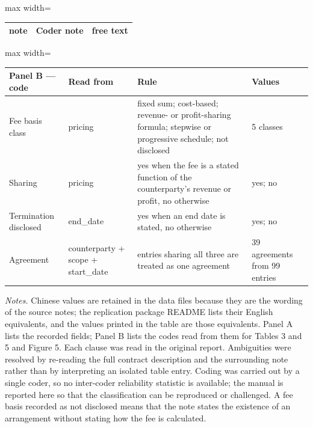 \documentclass[review,3p,times]{elsarticle}
\begin{document}
\begin{table}[!htbp]
\begin{minipage}{\textwidth}
\begin{adjustbox}{max width=\textwidth}
\begin{tabular}{@{}lll@{}}
note & Coder note & free text \\
\bottomrule
\end{tabular}
\end{adjustbox}
\par\medskip
\begin{adjustbox}{max width=\textwidth}
\begin{tabular}{@{}llll@{}}
\toprule
Panel B --- code & Read from & Rule & Values \\
\midrule
Fee basis class & pricing & fixed sum; cost-based; revenue- or profit-sharing formula; stepwise or progressive schedule; not disclosed & 5 classes \\
Sharing & pricing & yes when the fee is a stated function of the counterparty's revenue or profit, no otherwise & yes; no \\
Termination disclosed & end\_date & yes when an end date is stated, no otherwise & yes; no \\
Agreement & counterparty + scope + start\_date & entries sharing all three are treated as one agreement & 39 agreements from 99 entries \\
\bottomrule
\end{tabular}
\end{adjustbox}
\par\medskip
\raggedright
\noindent\textit{Notes.} Chinese values are retained in the data files because they are the wording of the source notes; the replication package README lists their English equivalents, and the values printed in the table are those equivalents. Panel A lists the recorded fields; Panel B lists the codes read from them for Tables 3 and 5 and Figure 5. Each clause was read in the original report. Ambiguities were resolved by re-reading the full contract description and the surrounding note rather than by interpreting an isolated table entry. Coding was carried out by a single coder, so no inter-coder reliability statistic is available; the manual is reported here so that the classification can be reproduced or challenged. A fee basis recorded as not disclosed means that the note states the existence of an arrangement without stating how the fee is calculated.
\end{minipage}
\end{table}
\end{document}
